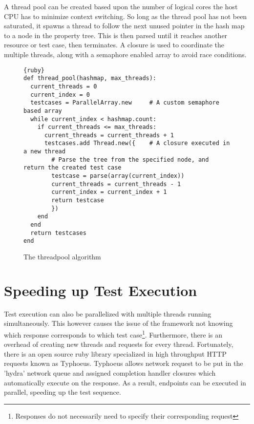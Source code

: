 
A thread pool can be created based upon the number of logical cores the host CPU has to minimize context switching. So long as the thread pool has not been saturated, it spawns a thread to follow the next unused pointer in the hash map to a node in the property tree. This is then parsed until it reaches another resource or test case, then terminates. A closure is used to coordinate the multiple threads, along with a semaphore enabled array to avoid race conditions.

\begin{figure}[ht]
\begin{lstlisting}[frame=lines]{ruby}
def thread_pool(hashmap, max_threads):
  current_threads = 0
  current_index = 0
  testcases = ParallelArray.new 	# A custom semaphore based array
  while current_index < hashmap.count:
    if current_threads <= max_threads:
      current_threads = current_threads + 1
      testcases.add Thread.new({ 	# A closure executed in a new thread
      	# Parse the tree from the specified node, and return the created test case
      	testcase = parse(array(current_index))	
      	current_threads = current_threads - 1
      	current_index = current_index + 1
      	return testcase
      	})
    end
  end
  return testcases
end
\end{lstlisting}
\caption{The threadpool algorithm}
\end{figure}

\section{Speeding up Test Execution}

Test execution can also be parallelized with multiple threads running simultaneously. This however causes the issue of the framework not knowing which response corresponds to which test case\footnote{Responses do not necessarily need to specify their corresponding request}. Furthermore, there is an overhead of creating new threads and requests for every thread. Fortunately, there is an open source ruby library specialized in high throughput HTTP requests known as Typhoeus\cite{typhoeussite}. Typhoeus allows network request to be put in the 'hydra' network queue and assigned completion handler closures which automatically execute on the response. As a result, endpoints can be executed in parallel, speeding up the test sequence.

